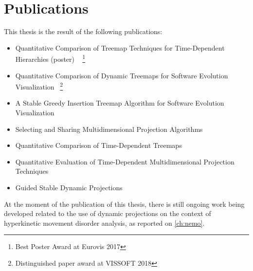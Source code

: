 \begingroup
\let\clearpage\relax
\let\cleardoublepage\relax
\let\cleardoublepage\relax

\manualmark
{} 

\chapter*{Publications}
This thesis is the result of the following publications:
\begin{itemize}
\item Quantitative Comparison of Treemap Techniques for Time-Dependent Hierarchies (poster) ~\citep{vernier17} \footnote{Best Poster Award at Eurovis 2017}
\item Quantitative Comparison of Dynamic Treemaps for Software Evolution Visualization~\citep{vernier18software} \footnote{Distinguished paper award at VISSOFT 2018}
\item A Stable Greedy Insertion Treemap Algorithm for Software Evolution Visualization~\citep{vernier18git}
\item Selecting and Sharing Multidimensional Projection Algorithms~\citep{EspadotoSharing}
\item Quantitative Comparison of Time-Dependent Treemaps~\citep{vernier_treemap}
\item Quantitative Evaluation of Time-Dependent Multidimensional Projection Techniques~\citep{Vernier2020}
\item Guided Stable Dynamic Projections~\citep{Vernier2021}
\end{itemize}

At the moment of the publication of this thesis, there is still ongoing work being developed related to the use of dynamic projections on the context of hyperkinetic movement disorder analysis, as reported on \cref{ch:nemo}. 

\endgroup
